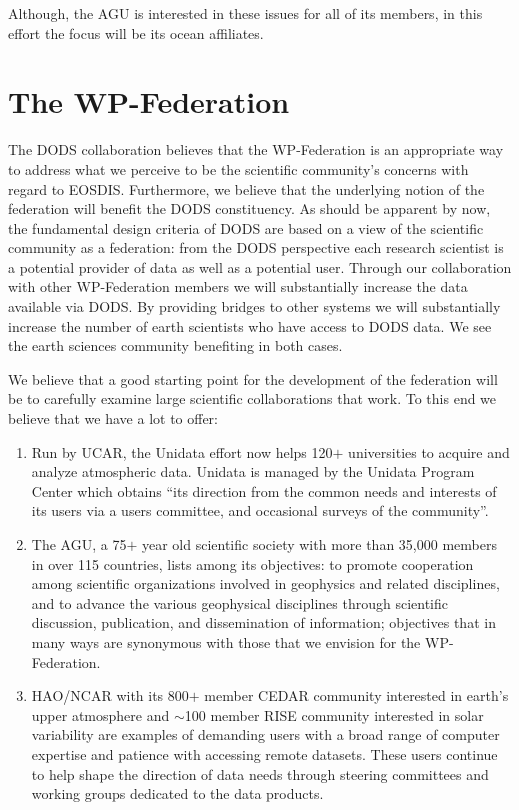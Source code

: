 \documentclass[12pt]{article}
\begin{document}
Although, the \ac{AGU} is interested in these issues for all of its
members, in this effort the focus will be its ocean affiliates.

\section{The WP-Federation}\label{wp-federation}

The \ac{DODS} collaboration believes that the WP-Federation is an 
appropriate way to address what we perceive to be the scientific 
community's concerns with regard to \acs{EOSDIS}. Furthermore, we 
believe that the underlying notion of the 
federation will benefit the \ac{DODS} constituency. As should be
apparent by now, the fundamental design criteria of \ac{DODS} are 
based on a view of the scientific community as a federation: from 
the \ac{DODS} perspective each research scientist is a potential 
provider of data as well as a potential user. Through our collaboration 
with other WP-Federation members we will substantially increase the 
data available via \ac{DODS}. By providing bridges to other 
systems we will substantially increase the number of earth scientists 
who have access to \ac{DODS} data. We see the earth sciences community 
benefiting in both cases.

We believe that a good starting point for the development of the
federation will be to carefully examine large scientific collaborations 
that work. To this end we believe that we have a lot to offer:

\begin{enumerate}

\item Run by \ac{UCAR}, the Unidata effort now helps 120$+$ 
universities to acquire and analyze atmospheric data.
Unidata is managed by the Unidata Program Center which obtains ``its 
direction from the common needs and interests of its users via a 
users committee, and occasional surveys of the community''. 

\item The \ac{AGU}, a 75$+$ year old scientific society with more 
than 35,000 members in over 115 countries, lists among its objectives: 
to promote cooperation among scientific organizations involved in 
geophysics and related disciplines, and to advance the various 
geophysical disciplines through scientific discussion, publication, 
and  dissemination of information; objectives that in many ways are
synonymous with those that we envision for the WP-Federation. 

\item \ac{HAO}/\ac{NCAR} with its 800$+$ member \ac{CEDAR} community
interested in earth's upper atmosphere and $\sim$100 member \ac{RISE}
community interested in solar variability are examples of demanding 
users with a broad range of computer expertise and patience with 
accessing remote datasets. These users continue to help shape the 
direction of data needs through steering committees and working 
groups dedicated to the data products.
\end{enumerate}
\end{document}
